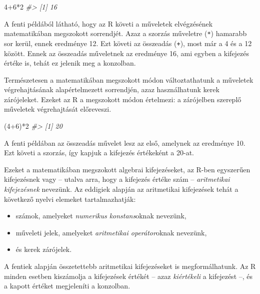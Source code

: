 \documentclass[
]{book}
\newenvironment{Shaded}{\begin{snugshade}}{\end{snugshade}}
\newcommand{\CommentTok}[1]{\textcolor[rgb]{0.56,0.35,0.01}{\textit{#1}}}
\newcommand{\DecValTok}[1]{\textcolor[rgb]{0.00,0.00,0.81}{#1}}
\newcommand{\NormalTok}[1]{#1}
\newcommand{\SpecialCharTok}[1]{\textcolor[rgb]{0.00,0.00,0.00}{#1}}
\providecommand{\tightlist}{%
  \setlength{\itemsep}{0pt}\setlength{\parskip}{0pt}}
\begin{document}
\begin{Shaded}
\begin{Highlighting}[]
\DecValTok{4}\SpecialCharTok{+}\DecValTok{6}\SpecialCharTok{*}\DecValTok{2}
\CommentTok{\#\textgreater{} [1] 16}
\end{Highlighting}
\end{Shaded}

A fenti példából látható, hogy az R követi a műveletek elvégzésének matematikában megszokott sorrendjét. Azaz a szorzás műveletre (\texttt{*}) hamarabb sor kerül, ennek eredménye 12. Ezt követi az összeadás (\texttt{+}), most már a 4 és a 12 között. Ennek az összeadás műveletnek az eredménye 16, ami egyben a kifejezés értéke is, tehát ez jelenik meg a konzolban.

Természetesen a matematikában megszokott módon változtathatunk a műveletek végrehajtásának alapértelmezett sorrendjén, azaz használhatunk kerek zárójeleket. Ezeket az R a megszokott módon értelmezi: a zárójelben szereplő műveletek végrehajtását előreveszi.

\begin{Shaded}
\begin{Highlighting}[]
\NormalTok{(}\DecValTok{4}\SpecialCharTok{+}\DecValTok{6}\NormalTok{)}\SpecialCharTok{*}\DecValTok{2}
\CommentTok{\#\textgreater{} [1] 20}
\end{Highlighting}
\end{Shaded}

A fenti példában az összeadás művelet lesz az első, amelynek az eredménye 10. Ezt követi a szorzás, így kapjuk a kifejezés értékeként a 20-at.

Ezeket a matematikában megszokott algebrai kifejezéseket, az R-ben egyszerűen kifejezésnek vagy -- utalva arra, hogy a kifejezés értéke szám -- \emph{aritmetikai kifejezésnek} nevezünk. Az eddigiek alapján az aritmetikai kifejezések tehát a következő nyelvi elemeket tartalmazhatják:

\begin{itemize}
\tightlist
\item
  számok, amelyeket \emph{numerikus konstans}oknak nevezünk,
\item
  műveleti jelek, amelyeket \emph{aritmetikai operátor}oknak nevezünk,
\item
  és kerek zárójelek.
\end{itemize}

A fentiek alapján összetettebb aritmetikai kifejezéseket is megformálhatunk. Az R minden esetben kiszámolja a kifejezések értékét -- azaz \emph{kiértékeli} a kifejezést --, és a kapott értéket megjeleníti a konzolban.
\end{document}
